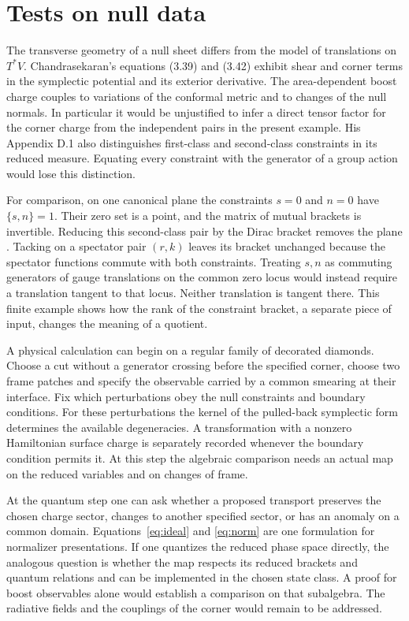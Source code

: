 \documentclass[11pt,letterpaper]{article}
\begin{document}
\section{Tests on null data}
The transverse geometry of a null sheet differs from the model of translations on $T^*V$.
Chandrasekaran's equations (3.39) and (3.42) exhibit shear and corner terms in the symplectic
potential and its exterior derivative. The area-dependent boost charge couples to variations
of the conformal metric and to changes of the null normals. In particular it would be
unjustified to infer a direct tensor factor for the corner charge from the independent pairs
in the present example. His Appendix D.1 also distinguishes first-class and second-class
constraints in its reduced measure. Equating every constraint with the generator of a group
action would lose this distinction.

For comparison, on one canonical plane the constraints $s=0$ and $n=0$ have $\{s,n\}=1$. Their
zero set is a point, and the matrix of mutual brackets is invertible. Reducing this
second-class pair by the Dirac bracket removes the plane \cite{dirac}. Tacking on a spectator pair $(r,k)$
leaves its bracket unchanged because the spectator functions commute with both constraints.
Treating $s,n$ as commuting generators of gauge translations on the common zero locus would
instead require a translation tangent to that locus. Neither translation is tangent there.
This finite example shows how the rank of the constraint bracket, a separate piece of input,
changes the meaning of a quotient.

A physical calculation can begin on a regular family of decorated diamonds. Choose a cut
without a generator crossing before the specified corner, choose two frame patches and specify
the observable carried by a common smearing at their interface. Fix which perturbations obey
the null constraints and boundary conditions. For these perturbations the kernel of the
pulled-back symplectic form determines the available degeneracies. A transformation with a
nonzero Hamiltonian surface charge is separately recorded whenever the boundary condition
permits it. At this step the algebraic comparison needs an actual map on the reduced variables
and on changes of frame.

At the quantum step one can ask whether a proposed transport preserves the chosen charge
sector, changes to another specified sector, or has an anomaly on a common domain.
Equations~\eqref{eq:ideal} and \eqref{eq:norm} are one formulation for normalizer
presentations. If one quantizes the reduced phase space directly, the analogous question is
whether the map respects its reduced brackets and quantum relations and can be implemented in
the chosen state class. A proof for boost observables alone would establish a comparison on
that subalgebra. The radiative fields and the couplings of the corner would remain to be
addressed.
\end{document}
